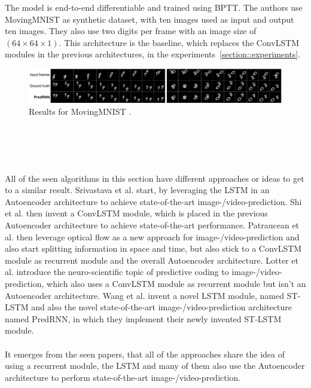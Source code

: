   The model is end-to-end differentiable and trained using BPTT. The authors use MovingMNIST as synthetic dataset, with ten images
  used as input and output ten images. They also use two digits per frame with an image size of $(64 \times 64 \times 1)$.
  This architecture is the baseline, which replaces the ConvLSTM modules in the previous architectures, in the experiments~\ref{section::experiments}.\\
  \begin{figure}[H]
   \includegraphics[width=1.0\textwidth]{../Images/predrnn_mnist.png}
   \centering
   \caption{Results for MovingMNIST \cite{Wang2017}.}
   \label{fig:predrnn_mnist}
  \end{figure}\noindent
\\\\
\\\\
All of the seen algorithms in this section have different approaches or ideas to get to a similar result.
Srivastava et al. \cite{Srivastava2015} start, by leveraging the LSTM in an Autoencoder architecture to achieve state-of-the-art image-/video-prediction.
Shi et al. \cite{Shi2015} then invent a ConvLSTM module, which is placed in the previous Autoencoder architecture to achieve state-of-the-art performance.
Patraucean et al. \cite{Patraucean2015} then leverage optical flow as a new approach for image-/video-prediction and also start splitting information in space and time, but also stick to a ConvLSTM module as recurrent module and the overall Autoencoder architecture.
Lotter et al. \cite{Lotter2016} introduce the neuro-scientific topic of
predictive coding to image-/video-prediction, which also uses a ConvLSTM module as recurrent module but isn't an Autoencoder architecture.
Wang et al. \cite{Wang2017} invent a novel LSTM module, named ST-LSTM and also the novel state-of-the-art image-/video-prediction architecture named PredRNN, in
which they implement their newly invented ST-LSTM module.
\\\\
It emerges from the seen papers, that all of the approaches share
the idea of using a recurrent module, the LSTM and many of them also use the Autoencoder architecture to perform state-of-the-art image-/video-prediction.